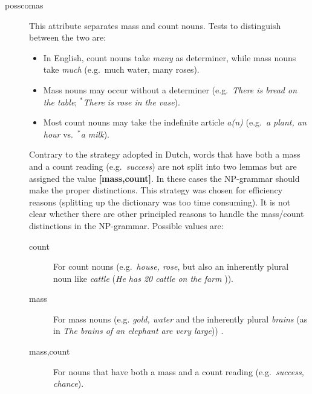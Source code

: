 \begin{description}
\item[posscomas] This attribute separates mass and count nouns. Tests to 
distinguish between the two are:
  \begin{itemize}
  \item In English, count nouns take {\em many\/} as determiner, while mass 
nouns take {\em much\/} (e.g.\ much water, many roses).
  \item Mass nouns may occur without a determiner (e.g.\ {\em There is bread on 
the table\/}; $^{*}${\em There is rose in the vase\/}).
  \item Most count nouns may take the indefinite article {\em a(n)\/} (e.g.\ 
{\em a plant, an hour\/} vs.\ $^{*}${\em a milk\/}).
  \end{itemize}
Contrary to the strategy adopted in Dutch, words that have both a mass and a 
count reading (e.g.\ {\em success\/}) are not split into two lemmas but are 
assigned the value {\bf [mass,count]}. In these cases the NP-grammar should 
make the proper distinctions. This strategy was chosen for efficiency reasons 
(splitting up the dictionary was too time consuming). It is not clear whether
there are other principled reasons to handle the mass/count distinctions 
in the NP-grammar.
Possible 
values are:
  \begin{description}
  \item[count] For count nouns (e.g.\ {\em house, rose\/}, but also an
inherently plural noun like {\em cattle\/} ({\em He has 20 cattle on the farm
\/})).
  \item[mass] For mass nouns (e.g. {\em gold, water\/} and the inherently 
plural {\em brains\/} (as in {\em The brains of an elephant are very large\/}))
.
  \item[mass,count] For nouns that have both a mass and a count reading (e.g.\ 
{\em success, chance\/}).
  \end{description}


\end{description}
